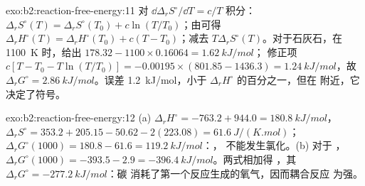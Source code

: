 \begin{solution}{exo:b2:reaction-free-energy:11}
对 $\dd\Delta_r S^\circ/\dd T = c/T$ 积分：$\Delta_r S^\circ(T) = \Delta_r
S^\circ(T_0) + c\ln(T/T_0)$；由可得 $\Delta_r H^\circ(T) = \Delta_r
H^\circ(T_0) + c(T - T_0)$；减去 $T\Delta_r S^\circ(T)$。对于石灰石，在
\qty{1100}{K} 时，给出 $178.32 - 1100 \times 0.16064 = \qty{1.62}{kJ/mol}$；
修正项 $c[T - T_0 - T\ln(T/T_0)] = -0.00195 \times (801.85 - 1436.3) =
\qty{+1.24}{kJ/mol}$，故 $\Delta_r G^\circ = \qty{2.86}{kJ/mol}$。误差
\qty{1.2}{kJ/mol}，小于 $\Delta_r H^\circ$ 的百分之一，但在
附近，它决定了符号。
\end{solution}

\begin{solution}{exo:b2:reaction-free-energy:12}
(a) $\Delta_r H^\circ = -763.2 + 944.0 = \qty{+180.8}{kJ/mol}$，$\Delta_r
S^\circ = 353.2 + 205.15 - 50.62 - 2(223.08) = \qty{+61.6}{J/(K.mol)}$；
$\Delta_r G^\circ(1000) = 180.8 - 61.6 = \qty{+119.2}{kJ/mol}$：，
不能发生氯化。(b) 对于 ，$\Delta_r G^\circ(1000) =
-393.5 - 2.9 = \qty{-396.4}{kJ/mol}$。两式相加得 ，其 $\Delta_r G^\circ = \qty{-277.2}{kJ/mol}$：碳
消耗了第一个反应生成的氧气，因而耦合反应
为强。
\end{solution}

